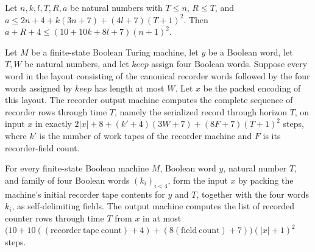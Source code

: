 \begin{lemma}
\label{Complexity.clCount_size_budget}
\leanok
{}
Let $n,k,l,T,R,a$ be natural numbers with $T\le n$, $R\le T$, and $a\le
2n+4+k(3n+7)+(4l+7)(T+1)^2$. Then $a+R+4\le (10+10k+8l+7)(n+1)^2$.
\end{lemma}

\begin{lemma}
\label{Complexity.clRecordOutput_compute}
\leanok
{}
Let $M$ be a finite-state Boolean Turing machine, let $y$ be a Boolean word, let $T,W$
be natural numbers, and let $keep$ assign four Boolean words. Suppose every word in the
layout consisting of the canonical recorder words followed by the four words assigned by
$keep$ has length at most $W$. Let $x$ be the packed encoding of this layout. The
recorder output machine computes the complete sequence of recorder rows through time
$T$, namely the serialized record through horizon $T$, on input $x$ in exactly
$2|x|+8+(k'+4)(3W+7)+(8F+7)(T+1)^2$ steps, where $k'$ is the number of work tapes of the
recorder machine and $F$ is its recorder-field count.
\end{lemma}

\begin{lemma}
\label{Complexity.clRecordOutput_quadratic}
\leanok
{}
For every finite-state Boolean machine $M$, Boolean word $y$, natural number $T$, and
family of four Boolean words $(k_i)_{i<4}$, form the input $x$ by packing the machine's
initial recorder tape contents for $y$ and $T$, together with the four words $k_i$, as
self-delimiting fields. The output machine computes the list of recorded counter rows
through time $T$ from $x$ in at most $\bigl(10+10((\mathrm{recorder\ tape\
count})+4)+(8(\mathrm{field\ count})+7)\bigr)(|x|+1)^2$ steps.
\end{lemma}

